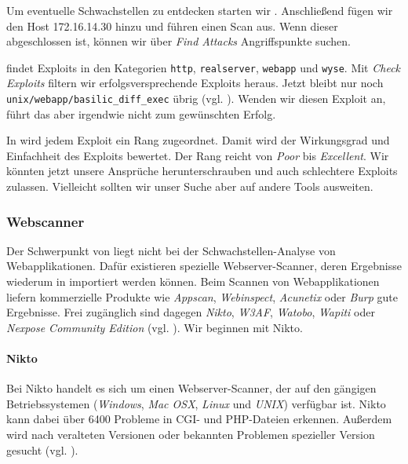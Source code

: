Um eventuelle Schwachstellen zu entdecken starten wir \Armitage{}. Anschließend
fügen wir den Host 172.16.14.30 hinzu und führen einen Scan aus. Wenn dieser
abgeschlossen ist, können wir über \emph{\glqq{}Find Attacks\grqq{}}
Angriffspunkte suchen.

\Armitage{} findet Exploits in den Kategorien \texttt{http},
\texttt{realserver}, \texttt{webapp} und \texttt{wyse}. Mit \emph{\glqq{}Check
  Exploits\grqq{}} filtern wir erfolgsversprechende Exploits heraus. Jetzt
bleibt nur noch \texttt{unix/webapp/basilic\_diff\_exec} übrig
(vgl. ). Wenden wir diesen Exploit an, führt das aber
irgendwie nicht zum gewünschten Erfolg.


In \Metasploit{} wird jedem Exploit ein Rang zugeordnet. Damit wird der
Wirkungsgrad und Einfachheit des Exploits bewertet. Der Rang reicht von
\emph{Poor} bis \emph{Excellent}. Wir könnten jetzt unsere Ansprüche
herunterschrauben und auch schlechtere Exploits zulassen. Vielleicht sollten wir
unser Suche aber auf andere Tools ausweiten.


\subsubsection{Webscanner}

Der Schwerpunkt von \Metasploit{} liegt nicht bei der Schwachstellen-Analyse von
Webapplikationen. Dafür existieren spezielle Webserver-Scanner, deren Ergebnisse
wiederum in \Metasploit{} importiert werden können. Beim Scannen von
Webapplikationen liefern kommerzielle Produkte wie \emph{Appscan},
\emph{Webinspect}, \emph{Acunetix} oder \emph{Burp} gute Ergebnisse. Frei
zugänglich sind dagegen \emph{Nikto}, \emph{W3AF}, \emph{Watobo}, \emph{Wapiti}
oder \emph{Nexpose Community Edition} (vgl. \cite[S.~281]{metahandbuch}). Wir
beginnen mit Nikto.

\paragraph{Nikto}

Bei Nikto handelt es sich um einen Webserver-Scanner, der auf den gängigen
Betriebssystemen (\emph{Windows}, \emph{Mac OSX}, \emph{Linux} und \emph{UNIX})
verfügbar ist. Nikto kann dabei über 6400 Probleme in CGI- und PHP-Dateien
erkennen. Außerdem wird nach veralteten Versionen oder bekannten Problemen
spezieller Version gesucht (vgl. \cite{Nikto}).

